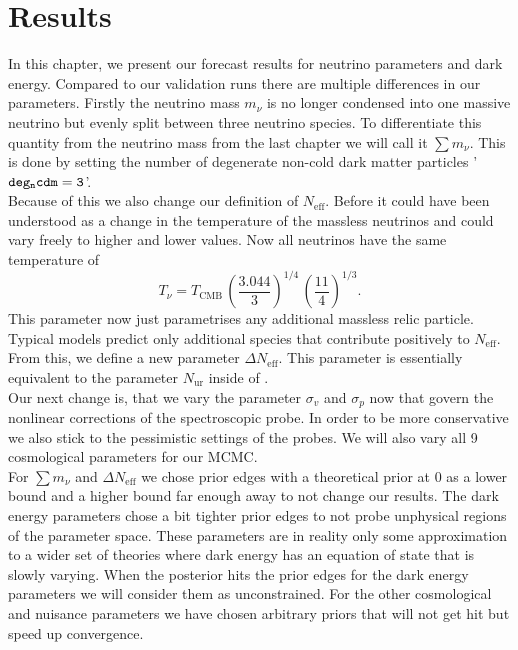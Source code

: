 \documentclass[../main.tex]{subfiles}
\begin{document}
\chapter{Results}
In this chapter, we present our forecast results for neutrino parameters and dark energy. Compared to our validation runs there are multiple differences in our parameters. Firstly the neutrino mass $m_\nu$ is no longer condensed into one massive neutrino but evenly split between three neutrino species. To differentiate this quantity from the neutrino mass from the last chapter we will call it $\sum m_\nu$. This is done by setting the number of degenerate non-cold dark matter particles '${\tt deg_ncdm=3}$'.\\
Because of this we also change our definition of $N_\mathrm{eff}$. Before it could have been understood as a change in the temperature of the massless neutrinos and could vary freely to higher and lower values. Now all neutrinos have the same temperature of \begin{equation}
    T_{\nu} = T_\mathrm{CMB}\,\left(\frac{3.044}{3}\right)^{1/4}\,\left(\frac{11}{4}\right)^{1/3}.
\end{equation}
This parameter now just parametrises any additional massless relic particle. Typical models predict only additional species that contribute positively to $N_\mathrm{eff}$. From this, we define a new parameter $\Delta N_\mathrm{eff}$. This parameter is essentially equivalent to the parameter $N_\mathrm{ur}$ inside of \class.\\
Our next change is, that we vary the parameter $\sigma_v$ and $\sigma_p$ now that govern the nonlinear corrections of the spectroscopic probe. In order to be more conservative we also stick to the pessimistic settings of the probes. We will also vary all 9 cosmological parameters for our MCMC.\\
For $\sum m_\nu$ and $\Delta N_\mathrm{eff}$ we chose prior edges with a theoretical prior at 0 as a lower bound and a higher bound far enough away to not change our results. The dark energy parameters chose a bit tighter prior edges to not probe unphysical regions of the parameter space. These parameters are in reality only some approximation to a wider set of theories where dark energy has an equation of state that is slowly varying. When the posterior hits the prior edges for the dark energy parameters we will consider them as unconstrained. For the other cosmological and nuisance parameters we have chosen arbitrary priors that will not get hit but speed up convergence.\\
\end{document}
